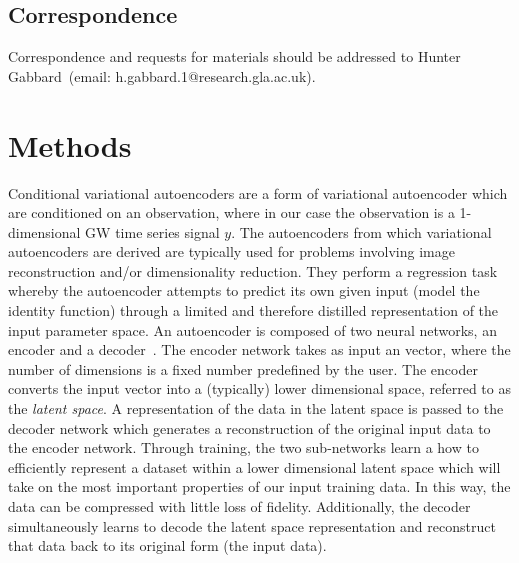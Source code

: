 \documentclass[%
showpacs,
 amsmath,amssymb,
 aps,
 twocolumn,
 prl,
 reprint,
floatfix,
]{revtex4-1}
\begin{document}
 \subsection{Correspondence} Correspondence and requests for materials should be addressed to Hunter Gabbard~(email: h.gabbard.1@research.gla.ac.uk).

%
%
\section{Methods}\label{sec:methods}
%

%
%
Conditional variational autoencoders are a form of variational autoencoder
which are conditioned on an observation, where in our case the observation is a
1-dimensional \ac{GW} time series signal $y$. The autoencoders from which
variational autoencoders are derived are typically used for problems involving
image reconstruction and/or dimensionality reduction. They perform a regression
task whereby the autoencoder attempts to predict its own given input (model the
identity function) through a limited and therefore distilled representation of
the input parameter space. An autoencoder is composed of two neural networks,
an encoder and a decoder~\cite{LIOU20083150}. The encoder network takes as
input an vector, where the number of dimensions is a fixed number predefined by
the user. The encoder converts the input vector into a (typically) lower
dimensional space, referred to as the {\it{latent space}}. A representation of
the data in the latent space is passed to the decoder network which generates a
reconstruction of the original input data to the encoder network. Through
training, the two sub-networks learn a how to efficiently represent a dataset
within a lower dimensional latent space which will take on the most important
properties of our input training data. In this way, the data can be compressed
with little loss of fidelity. Additionally, the decoder simultaneously learns
to decode the latent space representation and reconstruct that data back to its
original form (the input data).
\end{document}
